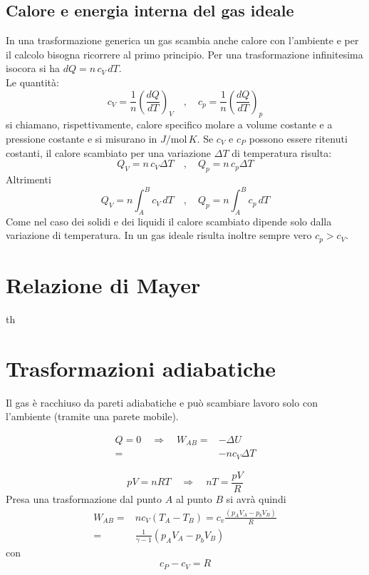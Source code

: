 \documentclass[x11names]{report}
\begin{document}
	\subsection{Calore e energia interna del gas ideale}
	In una trasformazione generica un gas scambia anche calore con l'ambiente e per il calcolo bisogna ricorrere al primo principio. Per una trasformazione infinitesima isocora si ha $dQ = n\,c_V\,dT$. \\Le quantità:
	\[ 
	c_V = \frac{1}{n}\left(\frac{dQ}{dT}\right)_V \quad,\quad c_p = \frac{1}{n}\left(\frac{dQ}{dT}\right)_p
	\]
	si chiamano, rispettivamente, calore specifico molare a volume costante e a pressione costante e si misurano in $J/\text{mol}\,K$. 
	Se $c_V$ e $c_P$ possono essere ritenuti costanti, il calore scambiato per una variazione $\Delta T$ di temperatura risulta: 
	\begin{equation} 
		Q_V = n\,c_V\Delta T \quad,\quad Q_p = n\,c_p\Delta T
	\end{equation}
	Altrimenti
	\begin{equation} 
		Q_V = n\int_{A}^{B} c_V\,dT \quad,\quad Q_p = n\int_{A}^{B} c_p\,dT
	\end{equation}
	Come nel caso dei solidi e dei liquidi il calore scambiato dipende solo dalla variazione di temperatura. In un gas ideale risulta inoltre sempre vero $c_p > c_V$. 
	
	
	
	\section{Relazione di Mayer}
	th
	\section{Trasformazioni adiabatiche}
	Il gas è racchiuso da pareti adiabatiche e può scambiare lavoro solo con l'ambiente (tramite una parete mobile).
	
	\begin{align*}
		Q = 0 \quad \Rightarrow \quad W_{AB} =& -\Delta U \\
		=& -nc_{V} \Delta T
	\end{align*}
	
	\[ 
	pV = nRT \quad \Rightarrow \quad nT = \frac{pV}{R}
	\]
	Presa una trasformazione dal punto \(A\) al punto \(B\) si avrà quindi
	\begin{align*}
		W_{AB} =& nc_{V}(T_{A} - T_{B}) = c_{v}\frac{(p_{A}V_{A} - p_{b}V_{B})}{R} \\
		=& \frac{1}{\gamma -1}(p_{A}V_{A} - p_{b}V_{B})
	\end{align*}
	con 
	\[ 
	\boxed{c_{P} - c_{V} = R}
	\]
	
\end{document}
